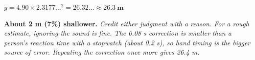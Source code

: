 \documentclass[12pt, twoside]{article}
\begin{document}
\begin{enumerate}[itemsep=0.5cm, start=9]
\begin{enumerate}[itemsep=0.3cm]
      $y = 4.90 \times 2.3177\ldots^2 = 26.32\ldots \approx
      \mathbf{26.3~\textbf{m}}$

      \textbf{About 2 m (7\%) shallower.} \emph{Credit either judgment with a
      reason. For a rough estimate, ignoring the sound is fine. The 0.08 s
      correction is smaller than a person's reaction time with a stopwatch (about
      0.2 s), so hand timing is the bigger source of error. Repeating the
      correction once more gives 26.4 m.}
  \end{enumerate}

\end{enumerate}
\end{document}
